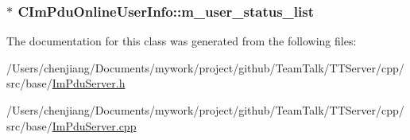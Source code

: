 \subsubsection[{m\+\_\+user\+\_\+status\+\_\+list}]{$\ast$ C\+Im\+Pdu\+Online\+User\+Info\+::m\+\_\+user\+\_\+status\+\_\+list\hspace{0.3cm}{\ttfamily [private]}}\label{class_c_im_pdu_online_user_info_a2ea200aabe47e48103cde1577ca0bfdb}


The documentation for this class was generated from the following files\+:\begin{DoxyCompactItemize}
\item 
/\+Users/chenjiang/\+Documents/mywork/project/github/\+Team\+Talk/\+T\+T\+Server/cpp/src/base/\hyperlink{_im_pdu_server_8h}{Im\+Pdu\+Server.\+h}\item 
/\+Users/chenjiang/\+Documents/mywork/project/github/\+Team\+Talk/\+T\+T\+Server/cpp/src/base/\hyperlink{_im_pdu_server_8cpp}{Im\+Pdu\+Server.\+cpp}\end{DoxyCompactItemize}
